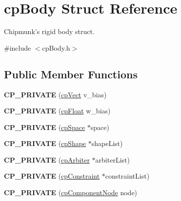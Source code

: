 \hypertarget{structcp_body}{\section{cp\-Body Struct Reference}
\label{structcp_body}
}


Chipmunk's rigid body struct.  




{\ttfamily \#include $<$cp\-Body.\-h$>$}

\subsection*{Public Member Functions}
\begin{DoxyCompactItemize}
\item 
\hypertarget{structcp_body_a09a4f534aec9e4841fd202580abbcf42}{{\bfseries C\-P\-\_\-\-P\-R\-I\-V\-A\-T\-E} (\hyperlink{structcp_vect}{cp\-Vect} v\-\_\-bias)}\label{structcp_body_a09a4f534aec9e4841fd202580abbcf42}

\item 
\hypertarget{structcp_body_a730d97128f0bd2ea456518d31d7ebe02}{{\bfseries C\-P\-\_\-\-P\-R\-I\-V\-A\-T\-E} (\hyperlink{group__basic_types_gac1ed65573e035bf892505768c852d8d3}{cp\-Float} w\-\_\-bias)}\label{structcp_body_a730d97128f0bd2ea456518d31d7ebe02}

\item 
\hypertarget{structcp_body_acebf6fd11853b9cec39935b2e304b826}{{\bfseries C\-P\-\_\-\-P\-R\-I\-V\-A\-T\-E} (\hyperlink{structcp_space}{cp\-Space} $\ast$space)}\label{structcp_body_acebf6fd11853b9cec39935b2e304b826}

\item 
\hypertarget{structcp_body_ae4c6facde2af5318b1b9b05b5c2552d5}{{\bfseries C\-P\-\_\-\-P\-R\-I\-V\-A\-T\-E} (\hyperlink{structcp_shape}{cp\-Shape} $\ast$shape\-List)}\label{structcp_body_ae4c6facde2af5318b1b9b05b5c2552d5}

\item 
\hypertarget{structcp_body_a1c91786e0cd30a5dca21ec6f9f7a9345}{{\bfseries C\-P\-\_\-\-P\-R\-I\-V\-A\-T\-E} (\hyperlink{structcp_arbiter}{cp\-Arbiter} $\ast$arbiter\-List)}\label{structcp_body_a1c91786e0cd30a5dca21ec6f9f7a9345}

\item 
\hypertarget{structcp_body_ab59478c4ebe9f7271f047c94b27bed5d}{{\bfseries C\-P\-\_\-\-P\-R\-I\-V\-A\-T\-E} (\hyperlink{structcp_constraint}{cp\-Constraint} $\ast$constraint\-List)}\label{structcp_body_ab59478c4ebe9f7271f047c94b27bed5d}

\item 
\hypertarget{structcp_body_a030f8969c132ba085fe69c8a7fa7bd83}{{\bfseries C\-P\-\_\-\-P\-R\-I\-V\-A\-T\-E} (\hyperlink{group__cp_body_gafd1d958a322b86c54e6b0a7109e4b0b9}{cp\-Component\-Node} node)}\label{structcp_body_a030f8969c132ba085fe69c8a7fa7bd83}

\end{DoxyCompactItemize}
